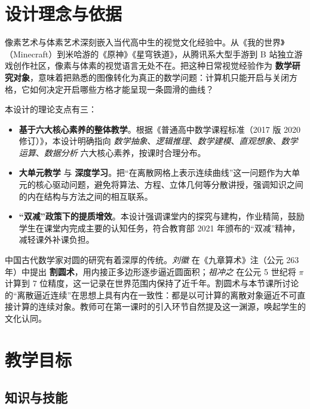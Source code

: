 \documentclass[12pt,a4paper]{scrartcl}
\newcommand{\acc}[1]{\textcolor{accent}{\textbf{#1}}}
\begin{document}
\section{设计理念与依据}

像素艺术与体素艺术深刻嵌入当代高中生的视觉文化经验中。从《我的世界》（Minecraft）到米哈游的《原神》《星穹铁道》，从腾讯系大型手游到 B 站独立游戏创作社区，像素与体素的视觉语言无处不在。把这种日常视觉经验作为 \acc{数学研究对象}，意味着把熟悉的图像转化为真正的数学问题：计算机只能开启与关闭方格，它如何决定开启哪些方格才能呈现一条圆滑的曲线？

本设计的理论支点有三：

\begin{itemize}[leftmargin=1.3em,itemsep=0.15em,topsep=0.3em]
  \item \acc{基于六大核心素养的整体教学}。根据《普通高中数学课程标准（2017 版 2020 修订）》，本设计明确指向 \emph{数学抽象}、\emph{逻辑推理}、\emph{数学建模}、\emph{直观想象}、\emph{数学运算}、\emph{数据分析} 六大核心素养，按课时合理分布。
  \item \acc{大单元教学} 与 \acc{深度学习}。把“在离散网格上表示连续曲线”这一问题作为大单元的核心驱动问题，避免将算法、方程、立体几何等分散讲授，强调知识之间的内在结构与方法之间的相互联系。
  \item \acc{“双减”政策下的提质增效}。本设计强调课堂内的探究与建构，作业精简，鼓励学生在课堂内完成主要的认知任务，符合教育部 2021 年颁布的“双减”精神，减轻课外补课负担。
\end{itemize}

\begin{shuoming}[文化与历史维度]
中国古代数学家对圆的研究有着深厚的传统。\emph{刘徽} 在《九章算术》注（公元 263 年）中提出 \acc{割圆术}，用内接正多边形逐步逼近圆面积；\emph{祖冲之} 在公元 5 世纪将 $\pi$ 计算到 7 位精度，这一记录在世界范围内保持了近千年。割圆术与本节课所讨论的“离散逼近连续”在思想上具有内在一致性：都是以可计算的离散对象逼近不可直接计算的连续对象。教师可在第一课时的引入环节自然提及这一渊源，唤起学生的文化认同。
\end{shuoming}

\section{教学目标}

\subsection{知识与技能}
\end{document}
